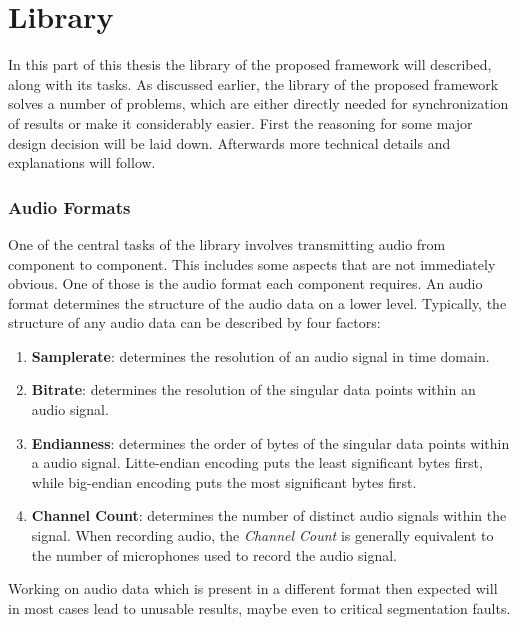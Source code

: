 


\section{Library}
\label{main:lib}
In this part of this thesis the library of the proposed framework will described, along with its tasks.
As discussed earlier, the library of the proposed framework solves a number of problems, which are either directly needed for synchronization of results or make it considerably easier.
First the reasoning for some major design decision will be laid down.
Afterwards more technical details and explanations will follow.


\subsubsection{Audio Formats}
\label{main:lib:formats}
One of the central tasks of the library involves transmitting audio from component to component.
This includes some aspects that are not immediately obvious.
One of those is the audio format each component requires.
An audio format determines the structure of the audio data on a lower level.
Typically, the structure of any audio data can be described by four factors:
\begin{enumerate}
	\item \textbf{Samplerate}: determines the resolution of an audio signal in time domain.
	\item \textbf{Bitrate}: determines the resolution of the singular data points within an audio signal.
	\item \textbf{Endianness}: determines the order of bytes of the singular data points within a audio signal. Litte-endian encoding puts the least significant bytes first, while big-endian encoding puts the most significant bytes first. 
	\item \textbf{Channel Count}: determines the number of distinct audio signals within the signal. When recording audio, the \textit{Channel Count} is generally equivalent to the number of microphones used to record the audio signal.
\end{enumerate}
Working on audio data which is present in a different format then expected will in most cases lead to unusable results, maybe even to critical segmentation faults. 

